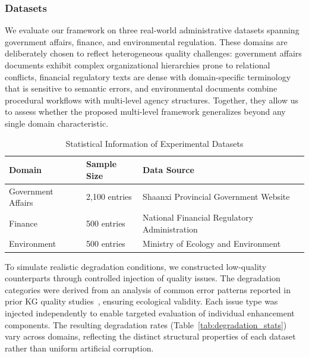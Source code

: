 \documentclass[runningheads]{llncs}
\begin{document}
\subsubsection{Datasets}
We evaluate our framework on three real-world administrative datasets spanning government affairs, finance, and environmental regulation. These domains are deliberately chosen to reflect heterogeneous quality challenges: government affairs documents exhibit complex organizational hierarchies prone to relational conflicts, financial regulatory texts are dense with domain-specific terminology that is sensitive to semantic errors, and environmental documents combine procedural workflows with multi-level agency structures. Together, they allow us to assess whether the proposed multi-level framework generalizes beyond any single domain characteristic.

\begin{table}[H]
    \centering
    \caption{Statistical Information of Experimental Datasets}
    \label{tab:dataset_stats}
    \begin{tabularx}{\textwidth}{l l X}
    \toprule
    Domain & Sample Size & Data Source \\
    \midrule
    Government Affairs & 2,100 entries & Shaanxi Provincial Government Website \\
    Finance & 500 entries & National Financial Regulatory Administration \\
    Environment & 500 entries & Ministry of Ecology and Environment \\
    \bottomrule
    \end{tabularx}
\end{table}

To simulate realistic degradation conditions, we constructed low-quality counterparts through controlled injection of quality issues. The degradation categories were derived from an analysis of common error patterns reported in prior KG quality studies~\cite{ref_zaveri2016,ref_paulheim2017}, ensuring ecological validity. Each issue type was injected independently to enable targeted evaluation of individual enhancement components. The resulting degradation rates (Table~\ref{tab:degradation_stats}) vary across domains, reflecting the distinct structural properties of each dataset rather than uniform artificial corruption.
\end{document}
